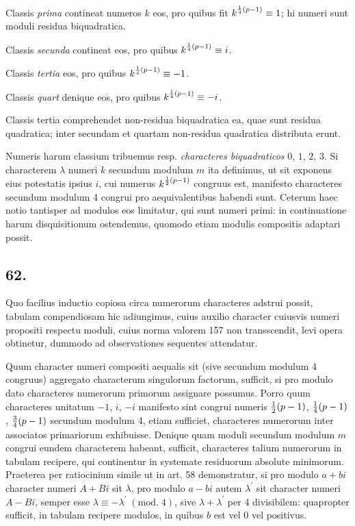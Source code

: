 \documentclass[twoside,12pt, showframe]{memoir}
\renewcommand{\pmod}[1]{\;(\textrm{mod.}\;#1)}
\let\oldfrac\frac
\def\frac#1#2{\mathchoice{\tfrac{#1}{#2}}{\oldfrac{#1}{#2}}{\genfrac{}{}{}{2}{#1}{#2\mathstrut}}{\genfrac{}{}{}{3}{#1}{#2\mathstrut}}}
\begin{document}
Classis \textit{prima} contineat numeros \(k\) eos, pro quibus fit \(k^{\frac{1}{4}(p-1)} \equiv 1\); hi numeri sunt moduli residua biquadratica.
 
Classis \textit{secunda} contineat eos, pro quibus \(k^{\frac{1}{4}(p-1)} \equiv i\).
 
Classis \textit{tertia} eos, pro quibus \(k^{\frac{1}{4}(p-1)} \equiv-1\).
 
Classis \textit{quart} denique eos, pro quibus \(k^{\frac{1}{4}(p-1)} \equiv-i\).
 
Classis tertia comprehendet non-residua biquadratica ea, quae sunt residua quadratica; inter secundam et quartam non-residua quadratica distributa erunt.
 
Numeris harum classium tribuemus resp. \textit{characteres biquadraticos} \(0\), \(1\), \(2\), \(3\). Si characterem \(\lambda\) numeri \(k\) secundum modulum \(m\) ita definimus, ut sit exponens eius potestatis ipsius \(i\), cui numerus \(k^{\frac{1}{2}(p-1)}\) congruus est, manifesto characteres secundum modulum 4 congrui pro aequivalentibus habendi sunt. Ceterum haec notio tantisper ad modulos eos limitatur, qui sunt numeri primi: in continuatione harum disquisitionum ostendemus, quomodo etiam modulis compositis adaptari possit.

\subsection*{62.}
 
Quo facilius inductio copiosa circa numerorum characteres adstrui possit, tabulam compendiosam hic adiungimus, cuius auxilio character cuiusvis numeri propositi respectu moduli, cuius norma valorem 157 non transscendit, levi opera obtinetur, dummodo ad observationes sequentes attendatur.\clearpage\noindent%
 
Quum character numeri compositi aequalis sit (sive secundum modulum 4 congruus) aggregato characterum singulorum factorum, sufficit, si pro modulo dato characteres numerorum primorum assignare possumus. Porro quum characteres unitatum \(-1\), \( i\), \(-i\) manifesto sint congrui numeris \(\frac{1}{2}(p-1)\), \( \frac{1}{4}(p-1)\), \( \frac{3}{4}(p-1)\) secundum modulum 4, etiam sufficiet, characteres numerorum inter associatos primariorum exhibuisse. Denique quam moduli secundum modulum \(m\) congrui eundem characterem habeant, sufficit, characteres talium numerorum in tabulam recipere, qui continentur in systemate residuorum absolute minimorum. Praeterea per ratiocinium simile ut in art. 58 demonstratur, si pro modulo \(a+b i\) character numeri \(A+B i\) sit \(\lambda\), pro modulo \(a-b i\) autem \(\lambda^{\prime}\) sit character numeri \(A-B i\), semper esse \(\lambda \equiv-\lambda^{\prime}\pmod{4}\), sive \(\lambda+\lambda^{\prime}\) per 4 divisibilem: quapropter sufficit, in tabulam recipere modulos, in quibus \(b\) est vel \(0\) vel positivus.
\end{document}
